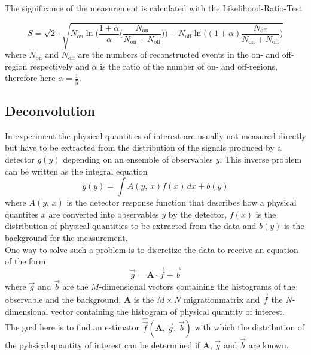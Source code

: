 The significance of the measurement is calculated with the Likelihood-Ratio-Test 

\begin{equation}
    S = \sqrt{2} \cdot \sqrt{N_\text{on} \ln \biggl( \frac{1+ \alpha}{\alpha} \biggl( \frac{N_\text{on}}{N_\text{on} + N_\text{off}} \biggr) \biggr) 
    + N_\text{off} \ln \biggl( (1+\alpha) \frac{N_\text{off}}{N_\text{on} + N_\text{off} } \biggr) }
\end{equation}
where $N_\text{on}$ and $N_\text{off}$ are the numbers of reconstructed events in the on- and off-region respectively and $\alpha$ is the ratio of the number of 
on- and off-regions, therefore here $\alpha = \frac{1}{5}$.


\subsection{Deconvolution}

In experiment the physical quantities of interest are usually not measured directly but have to be extracted from the distribution of the signals 
produced by a detector $g(y)$ depending on an ensemble of observables $y$. 
This inverse problem can be written as the integral equation 
\begin{equation}
    g(y) = \int A(y, \, x) f(x) \, dx + b(y)
\end{equation}
where $A(y, \, x)$ is the detector response function that describes how a physical quantites $x$ are converted into observables $y$ by the detector, $f(x)$ 
is the distribution of physical quantities to be extracted from the data and $b(y)$ is the background for the measurement. \\
One way to solve such a problem is to discretize the data to receive an equation of the form 
\begin{equation}
    \vec{g} = \textbf{A} \cdot \vec {f} + \vec{b}
    \label{eq:disc_inv}
\end{equation}
where $\vec{g}$ and $\vec {b}$ are the $M$-dimensional vectors containing the histograms of the observable and the background, $\textbf{A}$ is the 
$M\times N$ migrationmatrix and $\vec{f}$ the $N$-dimensional vector containing the histogram of physical quantity of interest. \\
The goal here is to find an estimator $\hat{\vec{f}}(\textbf{A}, \, \vec{g}, \, \vec{b})$ with which the distribution of the pyhsical quantity of interest 
can be determined if $\textbf{A}$, $\vec{g}$ and $\vec{b}$ are known.

